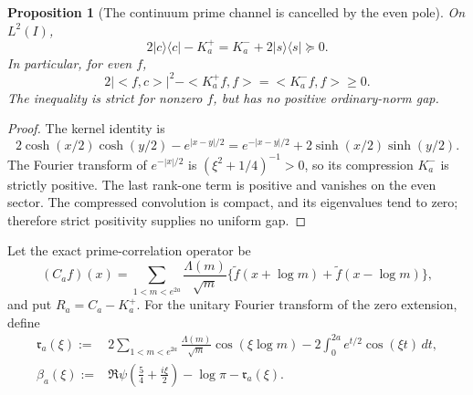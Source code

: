 \documentclass[11pt]{article}
\def\ip#1#2{<#1,#2>}%
\newtheorem{proposition}[theorem]{Proposition}
\theoremstyle{remark}
\newcommand{\ip}[2]{\left\langle #1,#2\right\rangle}
\begin{document}
\begin{proposition}[The continuum prime channel is cancelled by the even pole]
\label{prop:v130-continuum-cancellation}
On $L^2(I)$,
\begin{equation}\label{eq:v130-kernel-factorization}
 2|c\rangle\langle c|-K_a^+=K_a^-+2|s\rangle\langle s|\succeq0.
\end{equation}
In particular, for even $f$,
\[
 2|\ip f c|^2-\ip{K_a^+f}f=\ip{K_a^-f}f\ge0.
\]
The inequality is strict for nonzero $f$, but has no positive
ordinary-norm gap.
\end{proposition}
\begin{proof}
The kernel identity is
\[
 2\cosh(x/2)\cosh(y/2)-e^{|x-y|/2}
 =e^{-|x-y|/2}+2\sinh(x/2)\sinh(y/2).
\]
The Fourier transform of $e^{-|x|/2}$ is
$(\xi^2+1/4)^{-1}>0$, so its compression $K_a^-$ is strictly
positive. The last rank-one term is positive and vanishes on the even
sector. The compressed convolution is compact, and its eigenvalues
tend to zero; therefore strict positivity supplies no uniform gap.
\end{proof}

Let the exact prime-correlation operator be
\[
 (C_af)(x)=\sum_{1<m<e^{2a}}\frac{\Lambda(m)}{\sqrt m}
 \{\widetilde f(x+\log m)+\widetilde f(x-\log m)\},
\]
and put $R_a=C_a-K_a^+$. For the unitary Fourier transform of the zero
extension, define
\begin{align}
 \mathfrak r_a(\xi)
 :={}&2\sum_{1<m<e^{2a}}\frac{\Lambda(m)}{\sqrt m}
                 \cos(\xi\log m)
       -2\int_0^{2a}e^{t/2}\cos(\xi t)\,dt, \label{eq:v130-r-symbol}\\
 \beta_a(\xi)
 :={}&\Re\psi\!\left(\frac54+\frac{i\xi}{2}\right)-\log\pi
       -\mathfrak r_a(\xi). \label{eq:v130-beta}
\end{align}
\end{document}
